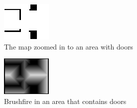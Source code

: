 \begin{figure}[ht]
\centering
  \begin{subfigure}[t]{0.3\textwidth}
    \includegraphics[width = \textwidth]{graphics/doors_in_map}
    \caption{The map zoomed in to an area with doors}
    \label{doors_in_map}
  \end{subfigure}
  \begin{subfigure}[t]{0.3\textwidth}
    \includegraphics[width = \textwidth]{graphics/brushfire_door}
    \caption{Brushfire in an area that contains doors}
    \label{brush_door}
  \end{subfigure}
  \begin{subfigure}[t]{0.3\textwidth}

\end{subfigure}
\end{figure}
